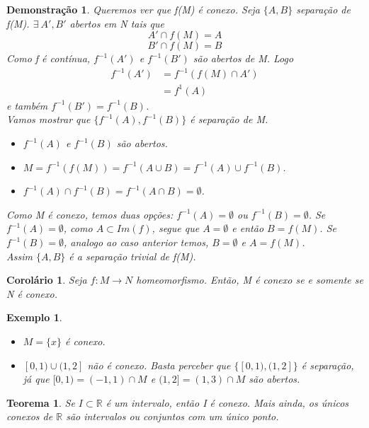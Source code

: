 \documentclass{article}
\newtheorem*{theorem}{Teorema}
\newtheorem{corolario}{Corolário}
\newtheorem*{exemplo}{Exemplo}
\newtheorem*{prova}{Demonstração}
\newcommand{\R}{\mathbb{R}}
\begin{document}
\begin{prova}
    Queremos ver que f(M) é conexo. Seja $\{A, B\}$ separação de f(M).
    $\exists \: A', B'$ abertos em N tais que 
    \[A' \cap f(M) = A\]
    \[B' \cap f(M) = B\]
    Como f é contínua, $f^{-1}(A')$ e $f^{-1}(B')$ são abertos de M.
    Logo
    \begin{align*}
        f^{-1}(A') &= f^{-1}(f(M) \cap A') \\
                   &= f^{1}(A) 
    \end{align*}
    e também $f^{-1}(B') = f^{-1}(B)$.\\
    Vamos mostrar que $\{f^{-1}(A), f^{-1}(B)\}$ é separação de M.
    \begin{itemize}
        \item $f^{-1}(A)$ e $f^{-1}(B)$ são abertos.
        \item $M = f^{-1}(f(M)) = f^{-1}(A \cup B) = f^{-1}(A) \cup f^{-1}(B)$.
        \item $f^{-1}(A) \cap f^{-1}(B) = f^{-1}(A \cap B) = \emptyset$.
    \end{itemize}
    Como M é conexo, temos duas opções: $f^{-1}(A) = \emptyset$ ou $f^{-1}(B) = \emptyset$.
    Se $f^{-1}(A) = \emptyset$, como $A \subset Im(f)$, segue que $A = \emptyset$ e então $B = f(M)$.
    Se $f^{-1}(B) = \emptyset$, analogo ao caso anterior temos, $B = \emptyset$ e $A = f(M)$.\\
    Assim $\{A, B\}$ é a separação trivial de f(M).
\end{prova}

\begin{corolario}
    Seja $f: M \rightarrow N$ homeomorfismo. Então, M é conexo se e somente se N é conexo.
\end{corolario}

\begin{exemplo}
    \
    \begin{itemize}
        \item $M = \{x\}$ é conexo.
        \item $[0, 1) \cup (1, 2]$ não é conexo. Basta perceber que $\{[0, 1), (1, 2]\}$ é separação, já que
            $[0, 1) = (-1, 1) \cap M$ e $(1, 2] = (1, 3) \cap M$ são abertos. 
    \end{itemize}
\end{exemplo}

\begin{theorem}
    Se $I \subset \R$ é um intervalo, então I é conexo. Mais ainda, os únicos conexos de $\R$ são intervalos ou conjuntos com um único ponto.
\end{theorem}
\end{document}
